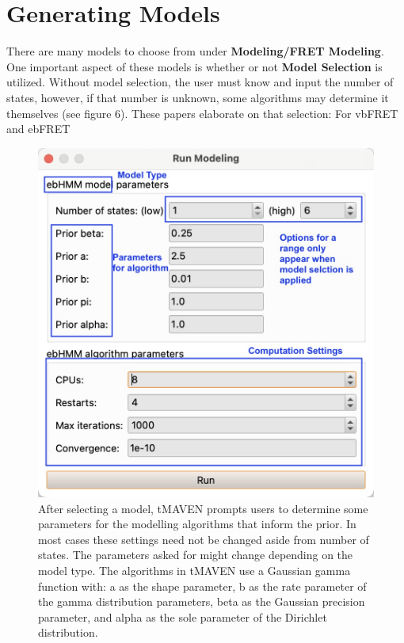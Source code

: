 \documentclass[11pt,a5paper,footinclude=true,headinclude=true]{scrbook} %
\begin{document}
\section{Generating Models}

There are many models to choose from under \textbf{Modeling/FRET Modeling}. One important aspect of these models is whether or not \textbf{Model Selection} is utilized. Without model selection, the user must know and input the number of states, however, if that number is unknown, some algorithms may determine it themselves (see figure 6). These papers elaborate on that selection:
For vbFRET \cite{bronson} and ebFRET \cite{van_de_Meent}
\begin{figure} [h]
    \centering
    \includegraphics[scale=0.2]{ModelingSettingsEx.jpg}
    \caption{After selecting a model, tMAVEN prompts users to determine some parameters for the modelling algorithms that inform the prior. In most cases these settings need not be changed aside from number of states. The parameters asked for might change depending on the model type. The algorithms in tMAVEN use a Gaussian gamma function with: a as the shape parameter, b as the rate parameter of the gamma distribution parameters, beta as the Gaussian precision parameter, and alpha as the sole parameter of the Dirichlet distribution.\cite{Bishop2006Pattern}}
    \label{fig:my_label}
\end{figure}
\end{document}
